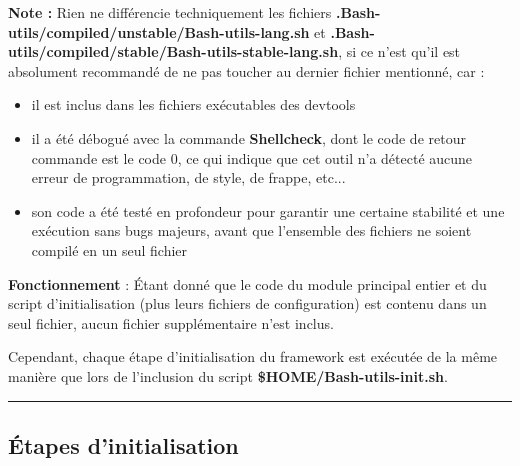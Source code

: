 \documentclass[a4paper,10pt]{article}
\begin{document}
    \begin{justify}
        \textbf{Note :} Rien ne différencie techniquement les fichiers \textbf{\color{path}.Bash-utils/compiled/unstable/Bash-utils-lang.sh} et \textbf{\color{path}.Bash-utils/compiled/stable/Bash-utils-stable-lang.sh}, si ce n'est qu'il est absolument recommandé de ne pas toucher au dernier fichier mentionné, car :\\\mbox{}
        \begin{itemize}
            \item il est inclus dans les fichiers exécutables des devtools\\\mbox{}

            \item il a été débogué avec la commande \textbf{\color{cmds}Shellcheck}, dont le code de retour commande est le code 0, ce qui indique que cet outil n'a détecté aucune erreur de programmation, de style, de frappe, etc...\\\mbox{}

            \item son code a été testé en profondeur pour garantir une certaine stabilité et une exécution sans bugs majeurs, avant que l'ensemble des fichiers ne soient compilé en un seul fichier
        \end{itemize}
    \end{justify}

    \begin{justify}
        \textbf{Fonctionnement} : Étant donné que le code du module principal entier et du script d'initialisation (plus leurs fichiers de configuration) est contenu dans un seul fichier, aucun fichier supplémentaire n'est inclus.
    \end{justify}

    \begin{justify}
        Cependant, chaque étape d'initialisation du framework est exécutée de la même manière que lors de l'inclusion du script \textbf{\color{vars}\$HOME/\color{path}Bash-utils-init.sh}.
    \end{justify}




    \color{sec2}\par\noindent\rule{\textwidth}{0.4pt}\color{text}

    \color{sec2}
    \subsection{Étapes d'initialisation}\color{text}
\end{document}
